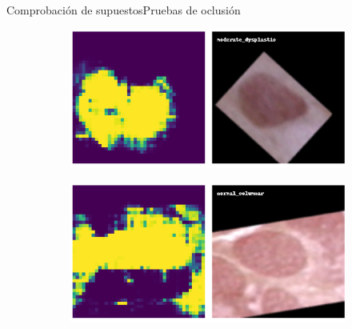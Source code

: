 \documentclass{beamer}
\begin{document}
\begin{frame}{Comprobación de supuestos}{Pruebas de oclusión}
\begin{figure}
    
            \begin{subfigure}{0.48\textwidth}
            \includegraphics[width=\textwidth]{occlusion-moderate_dysplastic25.pdf}
            \end{subfigure}\hspace*{\fill}
            \begin{subfigure}{0.48\textwidth}
            \includegraphics[width=\textwidth]{occlusion-normal_columnar34.pdf}
            \end{subfigure}
    

\end{figure}
\end{frame}
\end{document}
